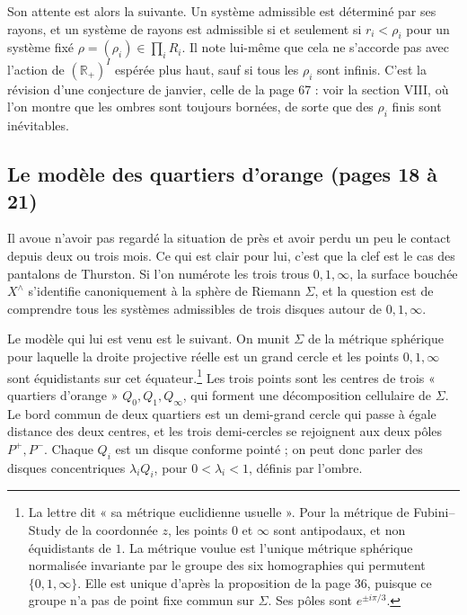 \documentclass[11pt,a4paper]{article}
\begin{document}
Son attente est alors la suivante. Un système admissible est déterminé par
ses rayons, et un système de rayons est admissible si et seulement si
$r_i < \rho_i$ pour un système fixé $\rho = (\rho_i) \in \prod_i R_i$. Il
note lui-même que cela ne s'accorde pas avec l'action de
$(\mathbb{R}_{+})^{I}$ espérée plus haut, sauf si tous les $\rho_i$ sont
infinis. C'est la révision d'une conjecture de janvier, celle de la
page 67 : voir la section VIII, où l'on montre que les ombres sont toujours
bornées, de sorte que des $\rho_i$ finis sont inévitables.

\subsection*{Le modèle des quartiers d'orange (pages 18 à 21)}

Il avoue n'avoir pas regardé la situation de près et avoir perdu un peu le
contact depuis deux ou trois mois. Ce qui est clair pour lui, c'est que la
clef est le cas des pantalons de Thurston. Si l'on numérote les trois trous
$0, 1, \infty$, la surface bouchée $X^{\wedge}$ s'identifie canoniquement à
la sphère de Riemann $\Sigma$, et la question est de comprendre tous les
systèmes admissibles de trois disques autour de $0, 1, \infty$.

Le modèle qui lui est venu est le suivant. On munit $\Sigma$ de la métrique
sphérique pour laquelle la droite projective réelle est un grand cercle et les
points $0, 1, \infty$ sont équidistants sur cet équateur.\footnote{La lettre
dit « sa métrique euclidienne usuelle ». Pour la métrique de Fubini--Study de
la coordonnée $z$, les points $0$ et $\infty$ sont antipodaux, et non
équidistants de $1$. La métrique voulue est l'unique métrique sphérique
normalisée invariante par le groupe des six homographies qui permutent
$\{0,1,\infty\}$. Elle est unique d'après la proposition de la page 36,
puisque ce groupe n'a pas de point fixe commun sur $\Sigma$. Ses pôles sont
$e^{\pm i\pi/3}$.} Les trois points sont les centres de trois « quartiers
d'orange » $Q_0, Q_1, Q_\infty$, qui forment une décomposition cellulaire de
$\Sigma$. Le bord commun de deux quartiers est un demi-grand cercle qui passe à
égale distance des deux centres, et les trois demi-cercles se rejoignent aux
deux pôles $P^{+}, P^{-}$. Chaque $Q_i$ est un disque conforme pointé ; on
peut donc parler des disques concentriques $\lambda_i Q_i$, pour
$0 < \lambda_i < 1$, définis par l'ombre.
\end{document}
